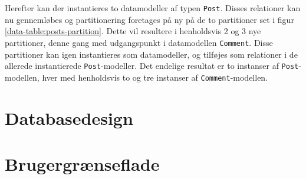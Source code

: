 Herefter kan der instantieres to datamodeller af typen \texttt{Post}. Disses relationer kan nu gennemløbes og partitionering foretages på ny på de to partitioner set i figur \ref{data-table:posts-partition}. Dette vil resultere i henholdsvis 2 og 3 nye partitioner, denne gang med udgangspunkt i datamodellen \texttt{Comment}. Disse partitioner kan igen instantieres som datamodeller, og tilføjes som relationer i de allerede instantierede \texttt{Post}-modeller. Det endelige resultat er to instanser af \texttt{Post}-modellen, hver med henholdsvis to og tre instanser af \texttt{Comment}-modellen.

\section{Databasedesign}

\section{Brugergrænseflade}